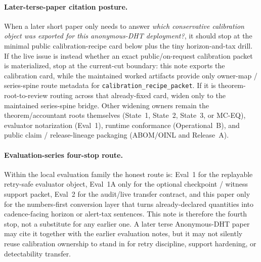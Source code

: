 \documentclass[11pt]{article}
\begin{document}
\paragraph{Later-terse-paper citation posture.}
When a later short paper only needs to answer \emph{which conservative calibration object was exported for this anonymous-DHT deployment?}, it should stop at the minimal public calibration-recipe card below plus the tiny horizon-and-tax drill.
If the live issue is instead whether an exact public/on-request calibration packet is materialized, stop at the current-cut boundary: this note exports the calibration card, while the maintained worked artifacts provide only owner-map / series-spine route metadata for \nolinkurl{calibration_recipe_packet}. If it is theorem-root-to-review routing across that already-fixed card, widen only to the maintained series-spine bridge. Other widening owners remain the theorem/accountant roots themselves (State~1, State~2, State~3, or MC-EQ), evaluator notarization (Eval~1), runtime conformance (Operational~B), and public claim / release-lineage packaging (ABOM/OINL and Release~A).\cite{state1,state2,state3,series:mceq,series:eval1,series:opB,series:abom,series:releaseproperty,series:workedexample,series:seriesspines}

\paragraph{Evaluation-series four-stop route.}
Within the local evaluation family the honest route is: Eval~1 for the replayable retry-safe evaluator object, Eval~1A only for the optional checkpoint / witness support packet, Eval~2 for the audit/live transfer contract, and this paper only for the numbers-first conversion layer that turns already-declared quantities into cadence-facing horizon or alert-tax sentences.
This note is therefore the fourth stop, not a substitute for any earlier one.
A later terse Anonymous-DHT paper may cite it together with the earlier evaluation notes, but it may not silently reuse calibration ownership to stand in for retry discipline, support hardening, or detectability transfer.
\end{document}
